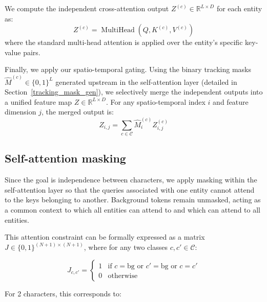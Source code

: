 \documentclass{article}
\begin{document}
We compute the independent cross-attention output $Z^{(c)} \in \mathbb{R}^{L \times D}$ for each entity as:
\begin{equation}
Z^{(c)} = \operatorname{MultiHead}(Q, K^{(c)}, V^{(c)})
\end{equation}
where the standard multi-head attention is applied over the entity's specific key-value pairs.

Finally, we apply our spatio-temporal gating. Using the binary tracking masks $\hat{M}^{(c)} \in \{0, 1\}^{L}$ generated upstream in the self-attention layer (detailed in Section~\ref{tracking_mask_gen}), we selectively merge the independent outputs into a unified feature map $Z \in \mathbb{R}^{L \times D}$. For any spatio-temporal index $i$ and feature dimension $j$, the merged output is:
\begin{equation}
    Z_{i,j} = \sum_{c\in\mathcal{C}}  \hat{M}^{(c)}_{i} Z^{(c)}_{i,j}
\end{equation}


\subsection{Self-attention masking}
Since the goal is independence between characters, we apply masking within the self-attention layer so that the queries associated with one entity cannot attend to the keys belonging to another. Background tokens remain unmasked, acting as a common context to which all entities can attend to and which can attend to all entities.

This attention constraint can be formally expressed as a matrix $J\in \{0,1\}^{(N+1)\times(N+1)}$, where for any two classes $c,c' \in \mathcal{C}$:

\begin{equation}
J_{c,c'} =
\begin{cases}
1 & \text{if } c = \text{bg} \text { or } c' = \text{bg} \text{ or } c = c' \\
0 & \text{otherwise}
\end{cases}
\end{equation}

For 2 characters, this corresponds to:
\end{document}
